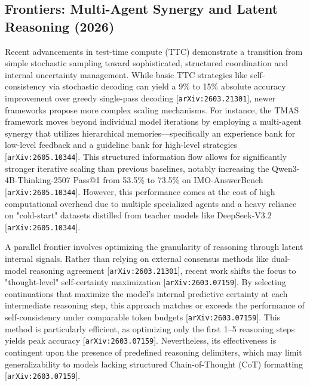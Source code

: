 \documentclass[11pt]{article}
\begin{document}
\subsection{Frontiers: Multi-Agent Synergy and Latent Reasoning (2026)}

Recent advancements in test-time compute (TTC) demonstrate a transition from simple stochastic sampling toward sophisticated, structured coordination and internal uncertainty management. While basic TTC strategies like self-consistency via stochastic decoding can yield a 9\% to 15\% absolute accuracy improvement over greedy single-pass decoding [\texttt{arXiv:2603.21301}], newer frameworks propose more complex scaling mechanisms. For instance, the TMAS framework moves beyond individual model iterations by employing a multi-agent synergy that utilizes hierarchical memories—specifically an experience bank for low-level feedback and a guideline bank for high-level strategies [\texttt{arXiv:2605.10344}]. This structured information flow allows for significantly stronger iterative scaling than previous baselines, notably increasing the Qwen3-4B-Thinking-2507 Pass@1 from 53.5\% to 73.5\% on IMO-AnswerBench [\texttt{arXiv:2605.10344}]. However, this performance comes at the cost of high computational overhead due to multiple specialized agents and a heavy reliance on "cold-start" datasets distilled from teacher models like DeepSeek-V3.2 [\texttt{arXiv:2605.10344}].

A parallel frontier involves optimizing the granularity of reasoning through latent internal signals. Rather than relying on external consensus methods like dual-model reasoning agreement [\texttt{arXiv:2603.21301}], recent work shifts the focus to "thought-level" self-certainty maximization [\texttt{arXiv:2603.07159}]. By selecting continuations that maximize the model's internal predictive certainty at each intermediate reasoning step, this approach matches or exceeds the performance of self-consistency under comparable token budgets [\texttt{arXiv:2603.07159}]. This method is particularly efficient, as optimizing only the first 1–5 reasoning steps yields peak accuracy [\texttt{arXiv:2603.07159}]. Nevertheless, its effectiveness is contingent upon the presence of predefined reasoning delimiters, which may limit generalizability to models lacking structured Chain-of-Thought (CoT) formatting [\texttt{arXiv:2603.07159}].
\end{document}
